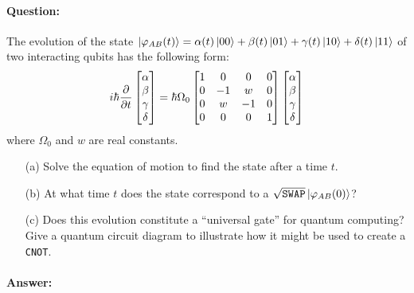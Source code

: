 \documentclass[reprint, amsmath,amssymb, aps]{revtex4-2}
\begin{document}
                \paragraph{Question:} The evolution of the state $\ket{\varphi_{AB}(t)} = \alpha(t)\ket{00} + \beta(t)\ket{01} + \gamma(t)\ket{10} + \delta(t)\ket{11}$ of two interacting qubits has the following form:
                \begin{equation*}
                    i\hbar\pdv{}{t}
                    \begin{bmatrix}
                    \alpha\\\beta\\\gamma\\\delta
                    \end{bmatrix} 
                    = \hbar\Omega_0
                    \begin{bmatrix}
                        1 & 0 & 0 & 0 \\
                        0 & -1 & w & 0 \\
                        0 & w & -1 & 0 \\
                        0 & 0 & 0 & 1
                    \end{bmatrix}
                    \begin{bmatrix}
                        \alpha \\ \beta \\ \gamma \\ \delta 
                    \end{bmatrix}
                \end{equation*}
                where $\Omega_0$ and $w$ are real constants.
                \begin{itemize}
                    \item[(a)] Solve the equation of motion to find the state after a time $t$.
                    \item[(b)] At what time $t$ does the state correspond to a $\sqrt{\texttt{SWAP}}\ket{\varphi_{AB}(0)}$?
                    \item[(c)] Does this evolution constitute a ``universal gate'' for quantum computing? Give a quantum circuit diagram to illustrate how it might be used to create a \texttt{CNOT}.

                \end{itemize}

                \begin{mdframed}
                \paragraph{Answer:}

                
                \end{mdframed}
                
\end{document}
